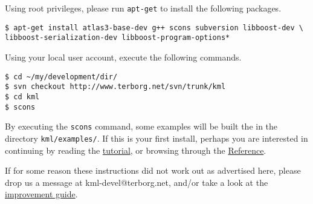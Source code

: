 \documentclass{article}
\begin{document}
Using root privileges, please run \texttt{apt-get} to install the following packages.
\begin{verbatim}
$ apt-get install atlas3-base-dev g++ scons subversion libboost-dev \ 
libboost-serialization-dev libboost-program-options*
\end{verbatim}
%
Using your local user account, execute the following commands.
\begin{verbatim}
$ cd ~/my/development/dir/
$ svn checkout http://www.terborg.net/svn/trunk/kml
$ cd kml
$ scons
\end{verbatim}
%
By executing the \texttt{scons} command, some examples will be built the in the directory \texttt{kml/examples/}.
If this is your first install, perhaps you are interested in continuing 
by reading the \href{\kmlroot/tutorial.html}{tutorial}, or browsing through 
the \href{\kmlroot/reference/}{Reference}.

If for some reason these instructions did not work out as advertised here,
please drop us a message at kml-devel@terborg.net, and/or take a look
at the \href{\kmlroot/improve.html}{improvement guide}.


% 
% 
% 
% 
\end{document}
